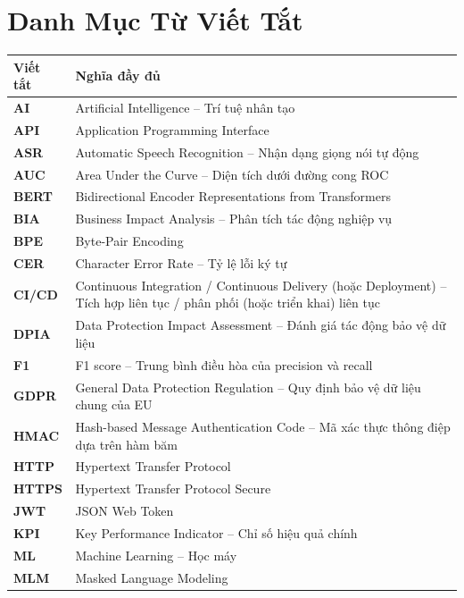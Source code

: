 \chapter*{Danh Mục Từ Viết Tắt}

\begin{longtable}{>{\bfseries}p{3cm} p{11cm}}
\toprule
\textbf{Viết tắt} & \textbf{Nghĩa đầy đủ} \\
\midrule
\endhead
\bottomrule
\endfoot
AI       & Artificial Intelligence -- Trí tuệ nhân tạo \\[4pt]
API      & Application Programming Interface \\[4pt]
ASR      & Automatic Speech Recognition -- Nhận dạng giọng nói tự động \\[4pt]
AUC      & Area Under the Curve -- Diện tích dưới đường cong ROC \\[4pt]
BERT     & Bidirectional Encoder Representations from Transformers \\[4pt]
BIA      & Business Impact Analysis -- Phân tích tác động nghiệp vụ \\[4pt]
BPE      & Byte-Pair Encoding \\[4pt]
CER      & Character Error Rate -- Tỷ lệ lỗi ký tự \\[4pt]
CI/CD    & Continuous Integration / Continuous Delivery (hoặc Deployment) -- Tích hợp liên tục / phân phối (hoặc triển khai) liên tục \\[4pt]
DPIA     & Data Protection Impact Assessment -- Đánh giá tác động bảo vệ dữ liệu \\[4pt]
F1       & F1 score -- Trung bình điều hòa của precision và recall \\[4pt]
GDPR     & General Data Protection Regulation -- Quy định bảo vệ dữ liệu chung của EU \\[4pt]
HMAC     & Hash-based Message Authentication Code -- Mã xác thực thông điệp dựa trên hàm băm \\[4pt]
HTTP     & Hypertext Transfer Protocol \\[4pt]
HTTPS    & Hypertext Transfer Protocol Secure \\[4pt]
JWT      & JSON Web Token \\[4pt]
KPI      & Key Performance Indicator -- Chỉ số hiệu quả chính \\[4pt]
ML       & Machine Learning -- Học máy \\[4pt]
MLM      & Masked Language Modeling \\[4pt]

\end{longtable}
